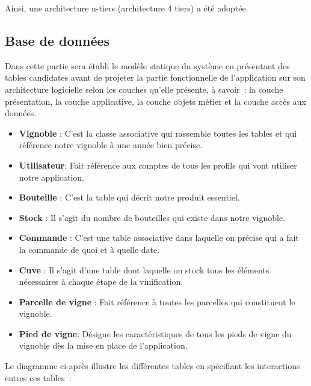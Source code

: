 \documentclass[a4paper, titlepage]{report}
\providecommand{\tightlist}{%
  \setlength{\itemsep}{0pt}\setlength{\parskip}{0pt}}
\begin{document}
Ainsi, une architecture n-tiers (architecture 4 tiers) a été adoptée.

\subsection{Base de données}\label{base-de-donnes}

Dans cette partie sera établi le modèle statique du système en
présentant des tables candidates avant de projeter la partie
fonctionnelle de l'application sur son architecture logicielle selon les
couches qu'elle présente, à savoir~: la couche présentation, la couche
applicative, la couche objets métier et la couche accès aux données.

\begin{itemize}
\tightlist
\item \textbf{Vignoble} : C'est la classe associative qui rassemble toutes les tables et qui référence notre vignoble à une année bien précise.
\item \textbf{Utilisateur}: Fait référence aux comptes de tous les profils qui vont utiliser notre application.
\item \textbf{Bouteille} : C'est la table qui décrit notre produit essentiel. 
\item \textbf{Stock} : Il s'agit du nombre de bouteilles qui existe dans notre vignoble.
\item \textbf{Commande} : C'est une table associative dans laquelle on précise qui a fait la commande de quoi et à quelle date.
\item \textbf{Cuve} : Il s'agit d'une table dont laquelle on stock tous les éléments nécessaires à chaque étape de la vinification.
\item \textbf{Parcelle de vigne} : Fait référence à toutes les parcelles qui constituent le vignoble.
\item \textbf{Pied de vigne}: Désigne les caractéristiques de tous les pieds de vigne du vignoble dès la mise en place de l'application.
\end{itemize}

Le diagramme ci-après illustre les différentes tables en spécifiant les
interactions entres ces tables~:
\end{document}
